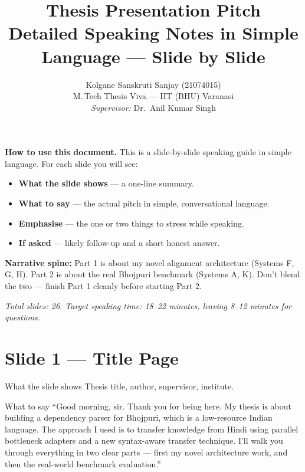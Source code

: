 \documentclass[11pt]{article}
\title{\vspace{-1cm}\Huge\textbf{Thesis Presentation Pitch}\\[4pt]
       \large Detailed Speaking Notes in Simple Language --- Slide by Slide}
\author{Kolgane Sanskruti Sanjay \quad (21074015)\\
        M.\,Tech Thesis Viva --- IIT (BHU) Varanasi\\
        \textit{Supervisor:} Dr.\ Anil Kumar Singh}
\date{}
\begin{document}
\maketitle
\thispagestyle{empty}

\vspace{-0.5cm}

\begin{tcolorbox}[colback=softbg,colframe=accent,boxrule=0.5pt]
\textbf{How to use this document.} This is a slide-by-slide speaking guide in simple language. For each slide you will see:
\begin{itemize}[leftmargin=*,itemsep=2pt]
  \item \textbf{What the slide shows} --- a one-line summary.
  \item \textbf{What to say} --- the actual pitch in simple, conversational language.
  \item \textbf{Emphasise} --- the one or two things to stress while speaking.
  \item \textbf{If asked} --- likely follow-up and a short honest answer.
\end{itemize}
\textbf{Narrative spine:} Part 1 is about my novel alignment architecture (Systems F, G, H). Part 2 is about the real Bhojpuri benchmark (Systems A, K). Don't blend the two --- finish Part 1 cleanly before starting Part 2.
\end{tcolorbox}

\vfill
\noindent\textit{Total slides: 26. Target speaking time: 18--22 minutes, leaving 8--12 minutes for questions.}

\clearpage

\section{Slide 1 --- Title Page}

\begin{pitchbox}{What the slide shows}
Thesis title, author, supervisor, institute.
\end{pitchbox}

\begin{pitchbox}{What to say}
``Good morning, sir. Thank you for being here. My thesis is about building a dependency parser for Bhojpuri, which is a low-resource Indian language. The approach I used is to transfer knowledge from Hindi using parallel bottleneck adapters and a new syntax-aware transfer technique. I'll walk you through everything in two clear parts --- first my novel architecture work, and then the real-world benchmark evaluation.''
\end{pitchbox}
\end{document}
